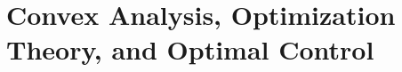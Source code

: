 \documentclass[../../book-en.tex]{subfiles}
\begin{document}
\chapter{Convex Analysis, Optimization Theory, and Optimal Control}
\label{ch:2.4-convex-optimization-en}



















\end{document}
